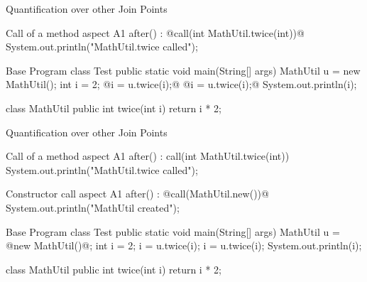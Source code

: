 \begin{frame}[fragile]{Quantification over other Join Points}
	\begin{mycolumns}[widths={50,50},animation=none]
\begin{codetight}{Call of a method}
aspect A1 {
	after() : @call(int MathUtil.twice(int))@ {
		System.out.println("MathUtil.twice called");
	}
}
\end{codetight}
	\mynextcolumn
\begin{codetight}{Base Program}
class Test {
	public static void main(String[] args) {
		MathUtil u = new MathUtil();
		int i = 2;
		@i = u.twice(i);@
		@i = u.twice(i);@
		System.out.println(i);
	}
}

class MathUtil {
	public int twice(int i) {
		return i * 2;
	}
}
\end{codetight}	
	\end{mycolumns}
\end{frame}

\begin{frame}[fragile]{Quantification over other Join Points}
	\begin{mycolumns}[widths={50,50},animation=none]
\begin{codetight}{Call of a method}
aspect A1 {
	after() : call(int MathUtil.twice(int)) {
		System.out.println("MathUtil.twice called");
	}
}
\end{codetight}
\begin{codetight}{Constructor call}
aspect A1 {
	after() : @call(MathUtil.new())@ {
		System.out.println("MathUtil created");
	}
}
\end{codetight}
	\mynextcolumn
\begin{codetight}{Base Program}
class Test {
	public static void main(String[] args) {
		MathUtil u = @new MathUtil()@;
		int i = 2;
		i = u.twice(i);
		i = u.twice(i);
		System.out.println(i);
	}
}

class MathUtil {
	public int twice(int i) {
		return i * 2;
	}
}
\end{codetight}	
	\end{mycolumns}
\end{frame}

